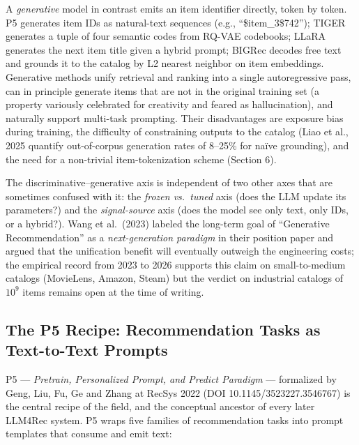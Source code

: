 \documentclass{article}
\begin{document}
A \emph{generative} model in contrast emits an item identifier directly, token by token. P5 \citep{geng2022recsys2022} generates item IDs as natural-text sequences (e.g., ``\$item\_3\$742''); TIGER \citep{rajput2023recommendersystems} generates a tuple of four semantic codes from RQ-VAE codebooks; LLaRA \citep{liao2024llaralargelanguage} generates the next item title given a hybrid prompt; BIGRec \citep{bao2023arxiv2305004472023} decodes free text and grounds it to the catalog by L2 nearest neighbor on item embeddings. Generative methods unify retrieval and ranking into a single autoregressive pass, can in principle generate items that are not in the original training set (a property variously celebrated for creativity and feared as hallucination), and naturally support multi-task prompting. Their disadvantages are exposure bias during training, the difficulty of constraining outputs to the catalog (Liao et al., 2025 quantify out-of-corpus generation rates of 8--25\% for naïve grounding), and the need for a non-trivial item-tokenization scheme (Section 6).

The discriminative--generative axis is independent of two other axes that are sometimes confused with it: the \emph{frozen vs.~tuned} axis (does the LLM update its parameters?) and the \emph{signal-source} axis (does the model see only text, only IDs, or a hybrid?). Wang et al.~(2023) labeled the long-term goal of ``Generative Recommendation'' as a \emph{next-generation paradigm} in their position paper and argued that the unification benefit will eventually outweigh the engineering costs; the empirical record from 2023 to 2026 supports this claim on small-to-medium catalogs (MovieLens, Amazon, Steam) but the verdict on industrial catalogs of \(10^9\) items remains open at the time of writing.

\subsection{The P5 Recipe: Recommendation Tasks as Text-to-Text Prompts}\label{the-p5-recipe-recommendation-tasks-as-text-to-text-prompts}

P5 --- \emph{Pretrain, Personalized Prompt, and Predict Paradigm} --- formalized by Geng, Liu, Fu, Ge and Zhang at RecSys 2022 (DOI 10.1145/3523227.3546767) is the central recipe of the field, and the conceptual ancestor of every later LLM4Rec system. P5 wraps five families of recommendation tasks into prompt templates that consume and emit text:
\end{document}
